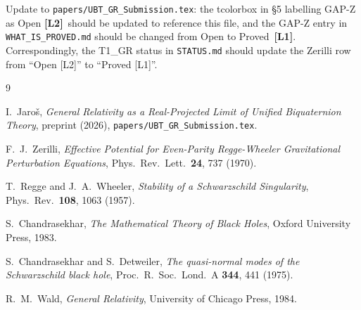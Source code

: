 \documentclass[12pt,a4paper]{article}
\theoremstyle{definition}
\theoremstyle{remark}
\newcommand{\Lone}{\textbf{[L1]}}
\newcommand{\Ltwo}{\textbf{[L2]}}
\begin{document}
\medskip
\noindent
Update to \texttt{papers/UBT\_GR\_Submission.tex}: the tcolorbox in §5 labelling
GAP-Z as Open \Ltwo\ should be updated to reference this file, and the GAP-Z
entry in \texttt{WHAT\_IS\_PROVED.md} should be changed from Open to Proved~\Lone.
Correspondingly, the T1\_GR status in \texttt{STATUS.md} should update the
Zerilli row from ``Open [L2]'' to ``Proved [L1]''.

\begin{thebibliography}{9}

I.\ Jaro\v{s},
\emph{General Relativity as a Real-Projected Limit of Unified Biquaternion Theory},
preprint (2026), \texttt{papers/UBT\_GR\_Submission.tex}.

F.\ J.\ Zerilli,
\emph{Effective Potential for Even-Parity Regge-Wheeler Gravitational Perturbation Equations},
Phys.\ Rev.\ Lett.\ \textbf{24}, 737 (1970).

T.\ Regge and J.\ A.\ Wheeler,
\emph{Stability of a Schwarzschild Singularity},
Phys.\ Rev.\ \textbf{108}, 1063 (1957).

S.\ Chandrasekhar,
\emph{The Mathematical Theory of Black Holes},
Oxford University Press, 1983.

S.\ Chandrasekhar and S.\ Detweiler,
\emph{The quasi-normal modes of the Schwarzschild black hole},
Proc.\ R.\ Soc.\ Lond.\ A \textbf{344}, 441 (1975).

R.\ M.\ Wald, \emph{General Relativity}, University of Chicago Press, 1984.

\end{thebibliography}
\end{document}
